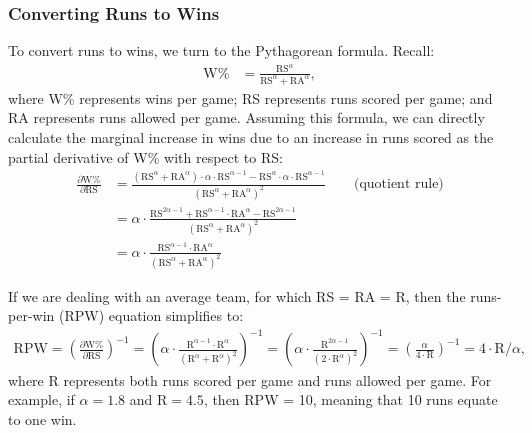 \documentclass{article}
\begin{document}
      \subsubsection{\sc Converting Runs to Wins}

        To convert runs to wins, we turn to the Pythagorean formula. Recall:
        \begin{align*}
          \text{W\%} & = \frac{\text{RS}^\alpha}{\text{RS}^\alpha + \text{RA}^\alpha},
        \end{align*}
        where W\% represents wins per game; RS represents runs scored per game; and RA represents runs allowed per game. Assuming this formula, we can directly calculate the marginal increase in wins due to an increase in runs scored as the partial derivative of W\% with respect to RS:
        \begin{align*}
          \frac{\partial \text{W\%}}{\partial \text{RS}} & = \frac{
            (\text{RS}^\alpha + \text{RA}^\alpha) \cdot \alpha \cdot \text{RS}^{\alpha - 1} - \text{RS}^\alpha \cdot \alpha \cdot \text{RS}^{\alpha - 1}
          }
          {
            (\text{RS}^\alpha + \text{RA}^\alpha)^2
          } \qquad\mbox{(quotient rule)}\\
            & = \alpha \cdot \frac{
            \text{RS}^{2\alpha - 1} + \text{RS}^{\alpha - 1} \cdot \text{RA}^\alpha - \text{RS}^{2\alpha - 1}
          }
          {
            (\text{RS}^\alpha + \text{RA}^\alpha)^2
          }\\
          & = \alpha \cdot \frac{\text{RS}^{\alpha - 1} \cdot \text{RA}^\alpha}{(\text{RS}^\alpha + \text{RA}^\alpha)^2}
        \end{align*}

        If we are dealing with an average team, for which RS = RA = R, then the runs-per-win (RPW) equation simplifies to:
        \begin{align*}
          \text{RPW} = \left(\frac{\partial \text{W\%}}{\partial \text{RS}}\right)^{-1}
            = \left(\alpha \cdot \frac{\text{R}^{\alpha - 1} \cdot \text{R}^\alpha}{(\text{R}^\alpha + \text{R}^\alpha)^2}\right)^{-1}
            = \left(\alpha \cdot \frac{\text{R}^{2\alpha - 1}}{(2 \cdot \text{R}^\alpha)^2}\right)^{-1}
            = \left(\frac{\alpha}{4 \cdot \text{R}}\right)^{-1}
            = 4 \cdot \text{R} / \alpha,
          \end{align*}
        where R represents both runs scored per game and runs allowed per game. For example, if $\alpha = 1.8$ and $\text{R} = 4.5$, then RPW = 10, meaning that 10 runs equate to one win.
\end{document}
